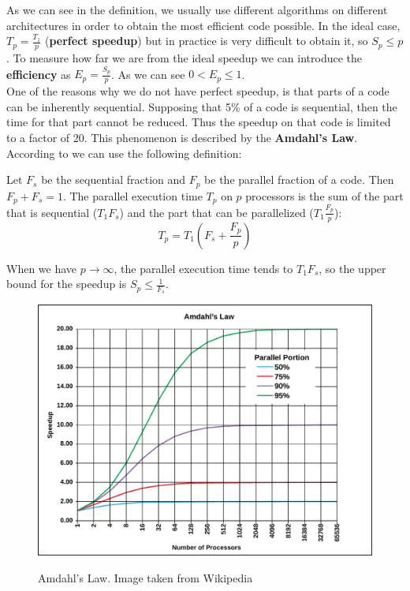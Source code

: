 As we can see in the definition, we usually use different algorithms on different architectures in order to obtain the most efficient code possible. In the ideal case, $T_{p} = \frac{T_{1}}{p}$ (\textbf{perfect speedup}) but in practice is very difficult to obtain it, so $S_{p} \leq p$. To measure how far we are from the ideal speedup we can introduce the \textbf{efficiency} as $E_{p} = \frac{S_{p}}{p}$. As we can see $0 < E_{p} \leq 1$.\\

One of the reasons why we do not have perfect speedup, is that parts of a code can be inherently sequential. Supposing that 5\% of a code is sequential, then the time for that part cannot be reduced. Thus the speedup on that code is limited to a factor of 20. This phenomenon is described by the \textbf{Amdahl's Law}. According to \cite{Eijkhout} we can use the following definition:

\begin{definition}
 Let $F_{s}$ be the sequential fraction and $F_{p}$ be the parallel fraction of a code. Then $F_{p} + F_{s} = 1$. The parallel execution time $T_{p}$ on $p$ processors is the sum of the part that is sequential ($T_{1}F_{s}$) and the part that can be parallelized ($T_{1}\frac{F_{p}}{p}$):
 \begin{equation}
  T_{p} = T_{1}(F_{s} + \frac{F_{p}}{p})
 \end{equation}
\end{definition}

When we have $p \rightarrow \infty$, the parallel execution time tends to $T_{1}F_{s}$, so the upper bound for the speedup is $S_{p} \leq \frac{1}{F_{s}}$.

\begin{figure}[htb] %
   \centering
   \includegraphics[width=0.70\linewidth]{images/AmdahlsLaw.pdf}\\
   \caption[Amdahl's Law]{Amdahl's Law. Image taken from Wikipedia}
   \label{fig:AmdahlsLaw}
\end{figure}

